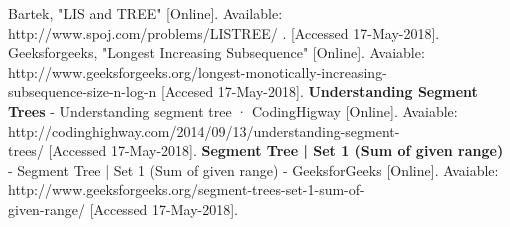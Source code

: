 \begin{thebibliography}{9}
	Bartek, "LIS and TREE" [Online]. Available: http://www.spoj.com/problems/LISTREE/ . [Accessed 17-May-2018]. 
	Geeksforgeeks, "Longest Increasing Subsequence" [Online]. Avaiable: http://www.geeksforgeeks.org/longest-monotically-increasing-\\subsequence-size-n-log-n [Accesed 17-May-2018].
	\textbf{Understanding Segment Trees} - Understanding segment tree · CodingHigway [Online]. Avaiable: http://codinghighway.com/2014/09/13/understanding-segment-\\trees/ [Accessed 17-May-2018].
	\textbf{Segment Tree | Set 1 (Sum of given range)} - Segment Tree | Set 1 (Sum of given range) - GeeksforGeeks [Online]. Avaiable: http://www.geeksforgeeks.org/segment-trees-set-1-sum-of-\\given-range/ [Accessed 17-May-2018].
\end{thebibliography}
